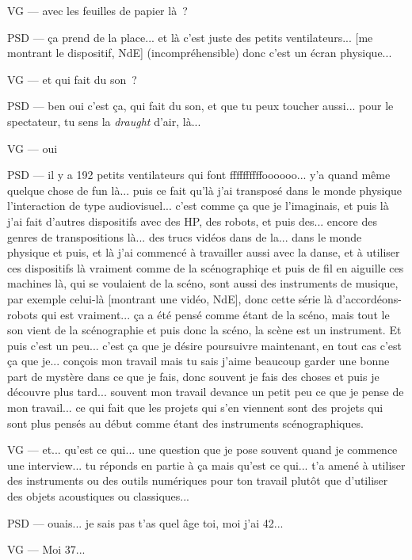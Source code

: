 VG — avec les feuilles de papier là ?

PSD — ça prend de la place... et là c'est juste des petits ventilateurs... [me montrant le dispositif,  NdE] (incompréhensible) donc c'est un écran physique...

VG — et qui fait du son ?

PSD — ben oui c'est ça, qui fait du son, et que tu peux toucher aussi... pour le spectateur, tu sens la \textit{draught} d'air, là...  

VG — oui

PSD — il y a 192 petits ventilateurs qui font ffffffffffoooooo... y'a quand même quelque chose de fun là... puis ce fait qu'là j'ai transposé dans le monde physique l'interaction de type audiovisuel... c'est comme ça que je l'imaginais, et puis là j'ai fait d'autres dispositifs avec des HP, des robots, et puis des... encore des genres de transpositions là... des trucs vidéos dans de la... dans le monde physique et puis, et là j'ai commencé à travailler aussi avec la danse, et à utiliser ces dispositifs là vraiment comme de la scénographiqe et puis de fil en aiguille ces machines là, qui se voulaient de la scéno, sont aussi des instruments de musique, par exemple celui-là [montrant une vidéo,  NdE], donc cette série là d'accordéons-robots qui est vraiment... ça a été pensé comme étant de la scéno, mais tout le son vient de la scénographie et puis donc la scéno, la scène est un instrument. Et puis c'est un peu... c'est ça que je désire poursuivre maintenant, en tout cas c'est ça que je... conçois mon travail mais tu sais j'aime beaucoup garder une bonne part de mystère dans ce que je fais, donc souvent je fais des choses et puis je découvre plus tard... souvent mon travail devance un petit peu ce que je pense de mon travail... ce qui fait que les projets qui s'en viennent sont des projets qui sont plus pensés au début comme étant des instruments scénographiques.

VG — et... qu'est ce qui... une question que je pose souvent quand je commence une interview... tu réponds en partie à ça mais qu'est ce qui... t'a amené à utiliser des instruments ou des outils numériques pour ton travail plutôt que d'utiliser des objets acoustiques ou classiques...

PSD — ouais... je sais pas t'as quel âge toi, moi j'ai 42...

VG — Moi 37...

